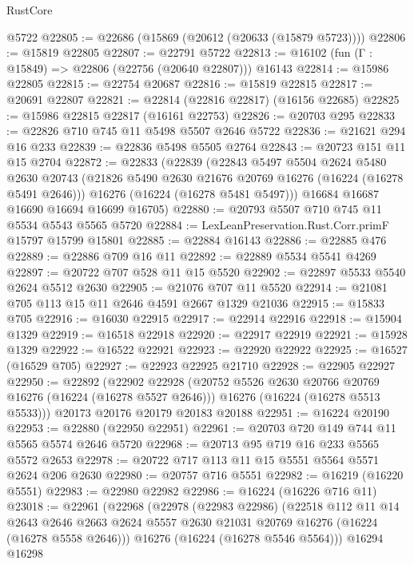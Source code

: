 \begin{lexlean}{RustCore}
\begin{coremodule}
    @5722
@22805 := @22686 (@15869 (@20612 (@20633 (@15879 @5723))))
@22806 := @15819 @22805
@22807 := @22791 @5722
@22813 := @16102 (fun (Γ : @15849) => @22806 (@22756 (@20640 @22807))) @16143
@22814 := @15986 @22805
@22815 := @22754 @20687
@22816 := @15819 @22815
@22817 := @20691 @22807
@22821 := @22814 (@22816 @22817) (@16156 @22685)
@22825 := @15986 @22815 @22817 (@16161 @22753)
@22826 := @20703 @295
@22833 := @22826 @710 @745 @11 @5498 @5507 @2646 @5722
@22836 := @21621 @294 @16 @233
@22839 := @22836 @5498 @5505 @2764
@22843 := @20723 @151 @11 @15 @2704
@22872 := @22833
    (@22839
      (@22843
        @5497
        @5504
        @2624
        @5480
        @2630
        @20743
        (@21826 @5490 @2630 @21676 @20769 @16276 (@16224 (@16278 @5491 @2646)))
        @16276
        (@16224 (@16278 @5481 @5497)))
      @16684
      @16687
      @16690
      @16694
      @16699
      @16705)
@22880 := @20793 @5507 @710 @745 @11 @5534 @5543 @5565 @5720
@22884 := LexLeanPreservation.Rust.Corr.primF @15797 @15799 @15801
@22885 := @22884 @16143
@22886 := @22885 @476
@22889 := @22886 @709 @16 @11
@22892 := @22889 @5534 @5541 @4269
@22897 := @20722 @707 @528 @11 @15 @5520
@22902 := @22897 @5533 @5540 @2624 @5512 @2630
@22905 := @21076 @707 @11 @5520
@22914 := @21081 @705 @113 @15 @11 @2646 @4591 @2667 @1329 @21036
@22915 := @15833 @705
@22916 := @16030 @22915
@22917 := @22914 @22916
@22918 := @15904 @1329
@22919 := @16518 @22918
@22920 := @22917 @22919
@22921 := @15928 @1329
@22922 := @16522 @22921
@22923 := @22920 @22922
@22925 := @16527 (@16529 @705)
@22927 := @22923 @22925 @21710
@22928 := @22905 @22927
@22950 := @22892
    (@22902
      @22928
      (@20752 @5526 @2630 @20766 @20769 @16276 (@16224 (@16278 @5527 @2646)))
      @16276
      (@16224 (@16278 @5513 @5533)))
    @20173
    @20176
    @20179
    @20183
    @20188
@22951 := @16224 @20190
@22953 := @22880 (@22950 @22951)
@22961 := @20703 @720 @149 @744 @11 @5565 @5574 @2646 @5720
@22968 := @20713 @95 @719 @16 @233 @5565 @5572 @2653
@22978 := @20722 @717 @113 @11 @15 @5551 @5564 @5571 @2624 @206 @2630
@22980 := @20757 @716 @5551
@22982 := @16219 (@16220 @5551)
@22983 := @22980 @22982
@22986 := @16224 (@16226 @716 @11)
@23018 := @22961
    (@22968
      (@22978
        (@22983 @22986)
        (@22518
          @112
          @11
          @14
          @2643
          @2646
          @2663
          @2624
          @5557
          @2630
          @21031
          @20769
          @16276
          (@16224 (@16278 @5558 @2646)))
        @16276
        (@16224 (@16278 @5546 @5564)))
      @16294
      @16298

\end{coremodule}
\end{lexlean}
